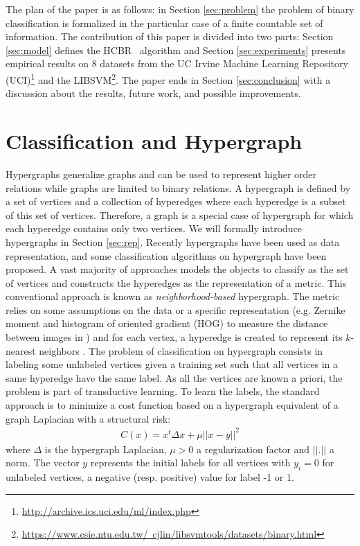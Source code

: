 \documentclass[sigconf,edbt]{acmart-edbt-workshops}
\def\HCBR{{\sc HCBR}}
\begin{document}
The plan of the paper is as follows: in Section \ref{sec:problem} the problem of binary classification is formalized in the particular case of a finite countable set of information. The contribution of this paper is divided into two parts: Section \ref{sec:model} defines the \HCBR~ algorithm and Section \ref{sec:experiments} presents empirical results on 8 datasets from the UC Irvine Machine Learning Repository (UCI)\footnote{\href{http://archive.ics.uci.edu/ml/index.php}{http://archive.ics.uci.edu/ml/index.php}} and the LIBSVM\footnote{\href{https://www.csie.ntu.edu.tw/~cjlin/libsvmtools/datasets/binary.html}{https://www.csie.ntu.edu.tw/~cjlin/libsvmtools/datasets/binary.html}}. The paper ends in Section \ref{sec:conclusion} with a discussion about the results, future work, and possible improvements.

\section{Classification and Hypergraph}
\label{sec:state_of_art}

Hypergraphs generalize graphs and can be used to represent higher order relations while graphs are limited to binary relations. A hypergraph is defined by a set of vertices and a collection of hyperedges where each hyperedge is a subset of this set of vertices. Therefore, a graph is a special case of hypergraph for which each hyperedge contains only two vertices. We will formally introduce hypergraphs in Section \ref{sec:rep}.
Recently hypergraphs have been used as data representation, and some classification algorithms on hypergraph have been proposed. A vast majority of approaches models the objects to classify as the set of vertices and constructs the hyperedges as the representation of a metric. This conventional approach is known as {\it neighborhood-based} hypergraph. The metric relies on some assumptions on the data or a specific representation (e.g. Zernike moment and histogram of oriented gradient (HOG) to measure the distance between images in \cite{ijcai2017-387}) and for each vertex, a hyperedge is created to represent its $k$-nearest neighbors \cite{5540012}. The problem of classification on hypergraph consists in labeling some unlabeled vertices given a training set such that all vertices in a same hyperedge have the same label. As all the vertices are known a priori, the problem is part of transductive learning. To learn the labels, the standard approach is to minimize a cost function based on a hypergraph equivalent of a graph Laplacian \cite{NIPS2006_3128,ijcai2017-387} with a structural risk:
\begin{align}
C(x) = x^t \Delta x + \mu ||x - y||^2
\end{align} where $\Delta$ is the hypergraph Laplacian, $\mu >0$ a regularization factor and $||.||$ a norm. The vector $y$ represents the initial labels for all vertices with $y_i = 0$ for unlabeled vertices, a negative (resp. positive) value for label -1 or 1.
\end{document}
